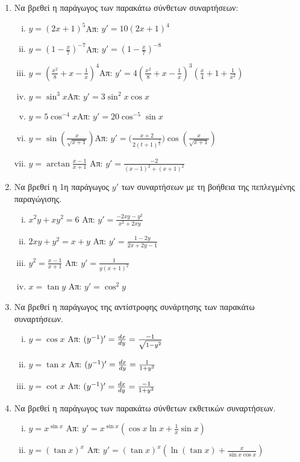 \documentclass[a4paper,12pt]{article}
\begin{document}
\begin{enumerate}
\pagebreak

\item Να βρεθεί η παράγωγος των παρακάτω σύνθετων συναρτήσεων:

\begin{enumerate}[i)]
\item $y=(2x+1)^5$\hfill Απ: $y'=10(2x+1)^4$
\item $y=\left(1-\frac{x}{7}\right)^{-7}$\hfill Απ: $y'=\left(1-\frac{x}{7}\right)^{-8}$
\item $y=\left(\frac{x^2}{8}+x-\frac{1}{x}\right)^4$\hfill Απ: $y'=4\left(\frac{x^2}{8}+x-\frac{1}{x}\right)^3\left(\frac{x}{4}+1+\frac{1}{x^2}\right)$
\item $y=\sin^3 x$\hfill Απ: $y'=3\sin^2x \cos x$
\item $y=5\cos^{-4}x$\hfill Απ: $y'=20\cos^{-5}\sin x$
\item $y=\sin\left(\frac{x}{\sqrt{x+1}}\right)$\hfill Απ: $y'=\biggl(\frac{x+2}{2(t+1)^{\frac{3}{2}}}\biggr)\cos\left(\frac{x}{\sqrt{x+1}}\right)$
\item $ y = \arctan{\frac{x-1}{x+1}}  $ \hfill Απ: $ y' = \frac{-2}{(x-1)^{2} + (x+1)^{2}} $
\end{enumerate}

\item Να βρεθεί η 1η παράγωγος $ y' $ των συναρτήσεων με τη βοήθεια της πεπλεγμένης
	παραγώγισης.

	\begin{enumerate}[i)]
		\item $  x^{2}y + xy^{2} = 6 $ \hfill Απ: $ y'  = \frac{-2xy - y^{2}}{x^{2} + 2xy}
			$
		\item $  2xy + y^{2} = x+y $ \hfill Απ: $ y' =  \frac{1-2y}{2x+2y-1} $
		\item $ y^{2} = \frac{x-1}{x+1} $ \hfill Απ: $ y' =  \frac{1}{y(x+1)^{2}} $
		\item $  x = \tan y $ \hfill Απ: $ y'  = \cos^{2}{y} $
	\end{enumerate}

\item Να βρεθεί η παράγωγος της αντίστροφης συνάρτησης των παρακάτω συναρτήσεων.

	\begin{enumerate}[i)]
		\item $ y = \cos{x} $ \hfill Απ: $ (y^{-1})' = \dv{x}{y} = \frac{-1}{\sqrt{1-y^{2}}} $
		\item $ y = \tan{x} $ \hfill Απ: $ (y^{-1})' = \dv{x}{y} = \frac{1}{1+y^{2}} $
		\item $ y = \cot{x} $ \hfill Απ: $ (y^{-1})' = \dv{x}{y} = \frac{-1}{1+y^{2}} $
	\end{enumerate}
	
\item Να βρεθεί η παράγωγος των παρακάτω σύνθετων εκθετικών συναρτήσεων.
	\begin{enumerate}[i)]
		\item $y = x^{\sin{x}} $ \hfill Απ: $ y' = x^{\sin{x}}\left(\cos{x} \ln{x} + \frac{1}{x} \sin{x} \right) $
		\item $ y= (\tan{x})^{x} $ \hfill Απ: $ y' = \left(\tan{x}\right)^{x} \left(\ln{(\tan{x})} +
			\frac{x}{\sin{x} \cos{x}}\right) $
	\end{enumerate}
\end{enumerate}
\end{document}
